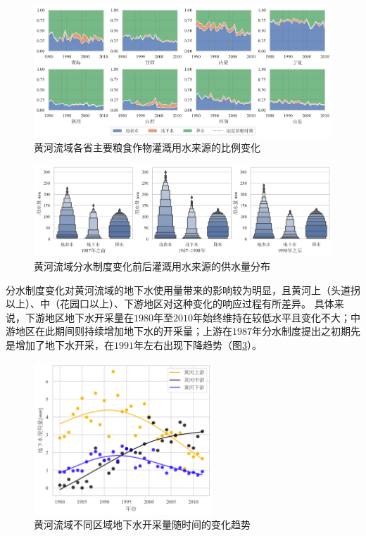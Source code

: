 \begin{figure}[htb]
    \centering
    \includegraphics[width=\textwidth]{img/ch6/ch6_green_blue_water.png}
    \caption{黄河流域各省主要粮食作物灌溉用水来源的比例变化}\label{ch6:fig:sources}
\end{figure}

\begin{figure}[htb]
    \centering
    \includegraphics[width=\textwidth]{img/ch6/ch6_sources_change.png}
    \caption{黄河流域分水制度变化前后灌溉用水来源的供水量分布}\label{ch6:fig:sources_change}
\end{figure}

分水制度变化对黄河流域的地下水使用量带来的影响较为明显，且黄河上（头道拐以上）、中（花园口以上）、下游地区对这种变化的响应过程有所差异。
具体来说，下游地区地下水开采量在$1980$年至$2010$年始终维持在较低水平且变化不大；中游地区在此期间则持续增加地下水的开采量；上游在$1987$年分水制度提出之初期先是增加了地下水开采，在$1991$年左右出现下降趋势（图\ref{ch6:fig:groundwater}）。

\begin{figure}[htb]
    \centering
    \includegraphics[width=0.6\textwidth]{img/ch6/ch6_groundwater.png}
    \caption{黄河流域不同区域地下水开采量随时间的变化趋势}\label{ch6:fig:groundwater}
\end{figure}